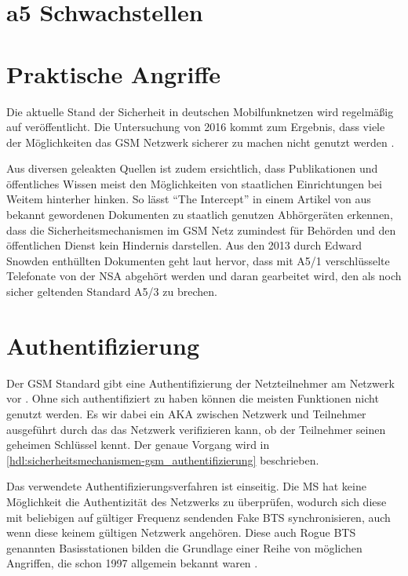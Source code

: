 \section{a5 Schwachstellen}

\section{Praktische Angriffe}

Die aktuelle Stand der Sicherheit in deutschen Mobilfunknetzen wird regelmäßig auf \citet{gsmmap} veröffentlicht. Die Untersuchung von 2016 kommt zum Ergebnis, dass viele der Möglichkeiten das \ac{GSM} Netzwerk sicherer zu machen nicht genutzt werden \citep{gsmmap:secrep-ger}.

Aus diversen geleakten Quellen ist zudem ersichtlich, dass Publikationen und öffentliches Wissen meist den Möglichkeiten von staatlichen Einrichtungen bei Weitem hinterher hinken. So lässt "`The Intercept"' in einem Artikel von \citet{theintercept:stingray-gemini} aus bekannt gewordenen Dokumenten zu staatlich genutzen Abhörgeräten erkennen, dass die Sicherheitsmechanismen im \ac{GSM} Netz zumindest für Behörden und den öffentlichen Dienst kein Hindernis darstellen. Aus den 2013 durch Edward Snowden enthüllten Dokumenten geht laut \citet{theintercept:nsa-auroragold} hervor, dass mit A5/1 verschlüsselte Telefonate von der \ac{NSA} abgehört werden und daran gearbeitet wird, den als noch sicher geltenden Standard A5/3 zu brechen.

\section{Authentifizierung}

Der \ac{GSM} Standard gibt eine Authentifizierung der Netzteilnehmer am Netzwerk vor . Ohne sich authentifiziert zu haben können die meisten Funktionen nicht genutzt werden. Es wir dabei ein  \ac{AKA} zwischen Netzwerk und Teilnehmer ausgeführt durch das das Netzwerk verifizieren kann, ob der Teilnehmer seinen geheimen Schlüssel kennt. Der genaue Vorgang wird in \autoref{hdl:sicherheitsmechanismen-gsm_authentifizierung} beschrieben. 

Das verwendete Authentifizierungsverfahren ist einseitig. Die \ac{MS} hat keine Möglichkeit die Authentizität des Netzwerks zu überprüfen, wodurch sich diese mit beliebigen auf gültiger Frequenz sendenden Fake \ac{BTS} synchronisieren, auch wenn diese keinem gültigen Netzwerk angehören. Diese auch Rogue \ac{BTS} genannten Basisstationen bilden die Grundlage einer Reihe von möglichen Angriffen, die schon 1997 allgemein bekannt waren \citep{fox2002imsi}.

